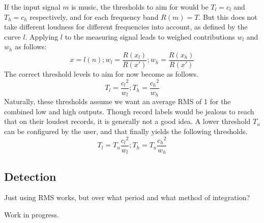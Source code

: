 \documentclass[11pt]{article}
\begin{document}
If the input signal $m$ is music, the thresholds to aim for would be $T_l = c_l$ and $T_h = c_h$ respectively, and for each frequency band $R(m) = T$.
But this does not take different loudness for different frequencies into account, as defined by the curve $l$.
Applying $l$ to the measuring signal leads to weighed contributions $w_l$ and $w_h$ as follows:
\[
    x = l(n) ;
    w_l = \dfrac{R(x_l)}{R(x')} ; w_h = \dfrac{R(x_h)}{R(x')}
\]
The correct threshold levels to aim for now become as follows.
\[
    T_l = \dfrac{{c_l}^2}{w_l} ; T_h = \dfrac{{c_h}^2}{w_h}
\]
Naturally, these thresholds assume we want an average RMS of 1 for the combined low and high outputs.
Though record labels would be jealous to reach that on their loudest records, it is generally not a good idea.
A lower threshold $T_u$ can be configured by the user, and that finally yields the following thresholds.
\[
    T_l = T_u \dfrac{{c_l}^2}{w_l} ; T_h = T_u \dfrac{{c_h}^2}{w_h}
\]

\subsection{Detection}\label{subsec:detection}

Just using RMS works, but over what period and what method of integration?

    Work in progress.
\end{document}
